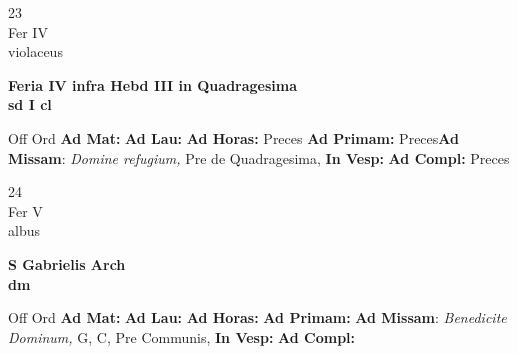 \documentclass[10pt, openany]{book}
\begin{document}
    \begin{center}
        \begin{minipage}{3.5in}
            \vspace{2em}
            \begin{minipage}{0.5in}
                {\Huge 23} \\
                {\normalsize Fer IV} \\
                {\normalsize violaceus}
            \end{minipage}
            \begin{minipage}{3.0in}
                \textbf{ \large Feria IV infra Hebd III in Quadragesima \\
                \textnormal{\normalsize sd I cl}} \\ 
            \end{minipage}
            \begin{justify}Off Ord
                \textbf{Ad Mat: }
                \textbf{Ad Lau: }
                \textbf{Ad Horas: }Preces
                \textbf{Ad Primam: }Preces\textbf{Ad Missam}: \textit{Domine refugium,} Pre de Quadragesima,  
                \textbf{In Vesp: }
                \textbf{Ad Compl: }Preces
            \end{justify}
        \end{minipage}
    \end{center}

    \begin{center}
        \begin{minipage}{3.5in}
            \vspace{2em}
            \begin{minipage}{0.5in}
                {\Huge 24} \\
                {\normalsize Fer V} \\
                {\normalsize albus}
            \end{minipage}
            \begin{minipage}{3.0in}
                \textbf{ \large S Gabrielis Arch \\
                \textnormal{\normalsize dm}} \\ 
            \end{minipage}
            \begin{justify}Off Ord
                \textbf{Ad Mat: }
                \textbf{Ad Lau: }
                \textbf{Ad Horas: }
                \textbf{Ad Primam: }\textbf{Ad Missam}: \textit{Benedicite Dominum,} G, C, Pre Communis,  
                \textbf{In Vesp: }
                \textbf{Ad Compl: }
            \end{justify}
        \end{minipage}
    \end{center}
\end{document}
